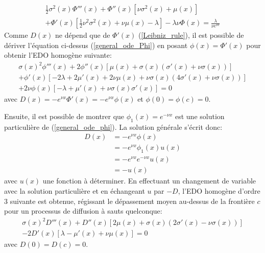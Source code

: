 \begin{equation}\label{general_ode_Phi}
    \begin{aligned}
        \frac{1}{2}\sigma^2(x)\Phi'''(x)+\Phi''(x)\left[\nu\sigma^2(x)+\mu(x)\right]\\+\Phi'(x)\left[\frac{1}{2}\nu^2\sigma^2(x)+\nu\mu(x)-\lambda\right]-\lambda\nu\Phi(x)=\frac{\lambda}{\nu e^{\nu c}}
    \end{aligned}
\end{equation}
Comme $D(x)$ ne dépend que de $\Phi'(x)$ (\ref{Leibniz_rule}), il est possible de dériver l'équation ci-dessus (\ref{general_ode_Phi}) en posant $\phi(x)=\Phi'(x)$ pour obtenir l'\acs{EDO} homogène suivante:
\begin{equation}\label{general_ode_phi}
    \begin{aligned}
        \sigma(x)^2 \phi'''(x)+2 \phi''(x) \left[\mu(x)+\sigma(x) \left(\sigma'(x)+\nu  \sigma(x)\right)\right]\\+\phi'(x) \left[-2 \lambda +2 \mu'(x)+2 \nu\mu(x)+\nu  \sigma(x) \left(4 \sigma'(x)+\nu  \sigma(x)\right)\right]\\+2 \nu  \phi(x) \left[-\lambda +\mu'(x)+\nu  \sigma(x) \sigma'(x)\right]=0
    \end{aligned}
\end{equation}
avec $D(x)=-e^{\nu x}\Phi'(x)=-e^{\nu x}\phi(x)$ et $\phi(0)=\phi(c)=0$.

Ensuite, il est possible de montrer que $\phi_1(x)=e^{-\nu x}$ est une solution particulière de (\ref{general_ode_phi}). La solution générale s'écrit donc: 
\[
\begin{aligned}
    D(x)&=-e^{\nu x}\phi(x)\\
    &=-e^{\nu x}\phi_1(x)u(x)\\
    &=-e^{\nu x}e^{-\nu x}u(x)\\
    &=-u(x)
\end{aligned}
\]
avec $u(x)$ une fonction à déterminer. En effectuant un changement de variable avec la solution particulière et en échangeant $u$ par $-D$, l'\acs{EDO} homogène d'ordre 3 suivante est obtenue, régissant le dépassement moyen au-dessus de la frontière $c$ pour un processus de diffusion à sauts quelconque: 
\begin{equation}\label{eq:general_ode_D}
    \begin{aligned}
        \sigma(x)^2 D'''(x)+D''(x) \left[2 \mu(x)+\sigma(x)(2\sigma'(x)-\nu  \sigma(x))\right]\\-2D'(x)[\lambda-\mu'(x)+\nu\mu(x)]=0
    \end{aligned}
\end{equation}
avec $D(0)=D(c)=0$.

